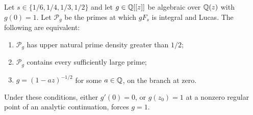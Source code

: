 \begin{theorem}
\label{thm:C-majority-lucas-gauges}
Let $s\in\{1/6,1/4,1/3,1/2\}$ and let $g\in\mathbb Q[[z]]$ be algebraic
over $\mathbb Q(z)$ with $g(0)=1$. Let $\mathcal P_g$ be the primes at
which $gF_s$ is integral and Lucas. The following are equivalent:
\begin{enumerate}
\item $\mathcal P_g$ has upper natural prime density greater than $1/2$;
\item $\mathcal P_g$ contains every sufficiently large prime;
\item $g=(1-az)^{-1/2}$ for some $a\in\mathbb Q$, on the branch at zero.
\end{enumerate}
Under these conditions, either $g'(0)=0$, or $g(z_0)=1$ at a nonzero
regular point of an analytic continuation, forces $g=1$.
\end{theorem}

